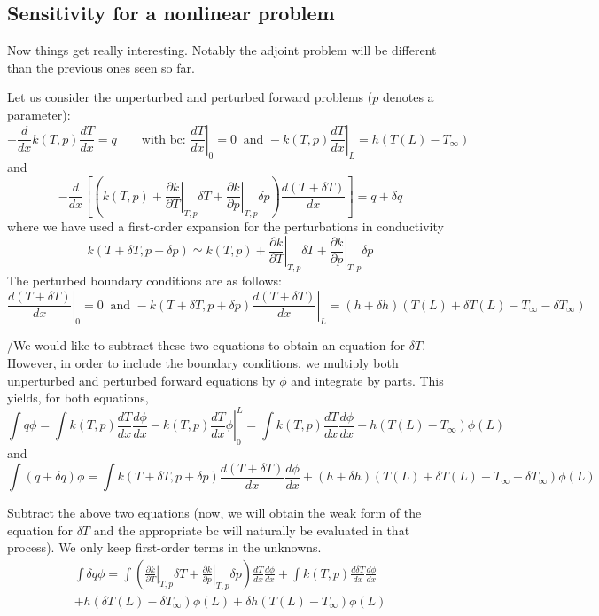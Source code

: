 \documentclass[11pt]{article}
\begin{document}
\subsection{Sensitivity for a nonlinear problem}

Now things get really interesting. Notably the adjoint problem will be different than the previous ones seen so far.

Let us consider the unperturbed and perturbed forward problems ($p$ denotes a parameter):
\[
-\frac{d}{dx}k(T,p)\frac{dT}{dx} = q \qquad \text{with bc: } \left.\frac{dT}{dx}\right|_0=0 \ \text{  and } -k(T,p)\left.\frac{dT}{dx}\right|_L=h(T(L)-T_\infty)
\]
and
\[
-\frac{d}{dx}\left[\left(k(T,p)+\left.\frac{\partial k}{\partial T}\right|_{T,p}\delta T+\left.\frac{\partial k}{\partial p}\right|_{T,p}\delta p\right) \frac{d(T+\delta T)}{dx}\right] = q+\delta q \]
where we have used a first-order expansion for the perturbations in conductivity
\[
k(T+\delta T, p+\delta p) \simeq k(T,p)+\left.\frac{\partial k}{\partial T}\right|_{T,p}\delta T+\left.\frac{\partial k}{\partial p}\right|_{T,p}\delta p
\]
The perturbed boundary conditions are as follows: 
\[
 \left.\frac{d(T+\delta T)}{dx}\right|_0=0 \ \text{ and } -k(T+\delta T, p+\delta p)\left.\frac{d(T+\delta T)}{dx}\right|_L=(h+\delta h)(T(L)+\delta T(L)-T_\infty-\delta T_\infty)
\]

/We would like to subtract these two equations to obtain an equation for $\delta T$. However, in order to include the boundary conditions, we multiply both unperturbed and perturbed forward equations by $\phi$ and integrate by parts. This yields, for both equations,
\begin{equation}
\int q\phi = \int k(T,p)\frac{dT}{dx}\frac{d\phi}{dx} - \left.k(T,p)\frac{dT}{dx}\phi\right|_0^L  
= \int k(T,p)\frac{dT}{dx}\frac{d\phi}{dx} +h(T(L)-T_\infty) \phi(L) 
\end{equation}
and
\begin{equation}
\int (q+\delta q)\phi = \int k(T+\delta T,p+\delta p)\frac{d(T+\delta T)}{dx}\frac{d\phi}{dx} +(h+\delta h)(T(L)+\delta T(L)-T_\infty-\delta T_\infty) \phi(L) 
\end{equation}

Subtract the above two equations (now, we will obtain the weak form of the equation for $\delta T$ and the appropriate bc will naturally be evaluated in that process). We only keep first-order terms in the unknowns.
\begin{multline}
\int \delta q\phi = \int \left(\left.\frac{\partial k}{\partial T}\right|_{T,p}\delta T+\left.\frac{\partial k}{\partial p}\right|_{T,p}\delta p\right) \frac{dT}{dx}\frac{d\phi}{dx} + \int k(T,p)\frac{d\delta T}{dx}\frac{d\phi}{dx} \\
+h(\delta T(L)-\delta T_\infty)  \phi(L)
+\delta h(T(L)-T_\infty)  \phi(L)
\end{multline}
\end{document}
